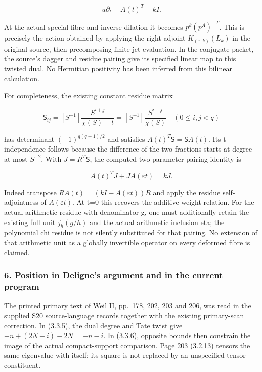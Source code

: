 \documentclass{article}
\begin{document}
\[
u\partial_t+A(t)^T-kI.
\tag{RW21}
\]

At the actual special fibre and inverse dilation it becomes \(p^k(p^A)^{-T}\). This is precisely the action obtained by applying the right adjoint \(K_{(\tau,k)}(L_k)\) in the original source, then precomposing finite jet evaluation. In the conjugate packet, the source's dagger and residue pairing give its specified linear map to this twisted dual. No Hermitian positivity has been inferred from this bilinear calculation.

For completeness, the existing constant residue matrix

\[
\mathsf S_{ij}=[S^{-1}]\frac{S^{i+j}}{\chi(S)-t}
=[S^{-1}]\frac{S^{i+j}}{\chi(S)}
\quad(0\le i,j<q)
\tag{RW22}
\]

has determinant \((-1)^{q(q-1)/2}\) and satisfies \(A(t)^T\mathsf S=\mathsf SA(t)\). Its t-independence follows because the difference of the two fractions starts at degree at most \(S^{-2}\). With \(J=R^T\mathsf S\), the computed two-parameter pairing identity is

\[
\boxed{A(t)^T J+J A(\varepsilon t)=kJ.}
\tag{RW23}
\]

Indeed transpose \(RA(t)=(kI-A(\varepsilon t))R\) and apply the residue self-adjointness of \(A(\varepsilon t)\). At t=0 this recovers the additive weight relation. For the actual arithmetic residue with denominator g, one must additionally retain the existing full unit \(j_h(g/h)\) and the actual arithmetic inclusion eta; the polynomial chi residue is not silently substituted for that pairing. No extension of that arithmetic unit as a globally invertible operator on every deformed fibre is claimed.

\subsubsection{6. Position in Deligne's argument and in the current program}\label{endpoint-f1_reflection--position-in-delignes-argument-and-in-the-current-program}

The printed primary text of Weil II, pp.~178, 202, 203 and 206, was read in the supplied S20 source-language records together with the existing primary-scan correction. In (3.3.5), the dual degree and Tate twist give \(-n+(2N-i)-2N=-n-i\). In (3.3.6), opposite bounds then constrain the image of the actual compact-support comparison. Page 203 (3.2.13) tensors the same eigenvalue with itself; its square is not replaced by an unspecified tensor constituent.
\end{document}
